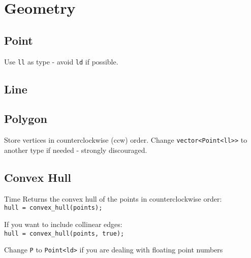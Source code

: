 \section{Geometry}

\subsection{Point}
Use \verb|ll| as type - avoid \verb|ld| if possible.



\subsection{Line}


\subsection{Polygon}
Store vertices in counterclockwise (ccw) order.
Change \verb|vector<Point<ll>>| to another type if needed - strongly discouraged.



\subsection{Convex Hull}
 Time
Returns the convex hull of the points in counterclockwise order: \\
\verb|hull = convex_hull(points);|

If you want to include collinear edges: \\
\verb|hull = convex_hull(points, true);|

Change \verb|P| to \verb|Point<ld>| if you are dealing with floating point numbers

